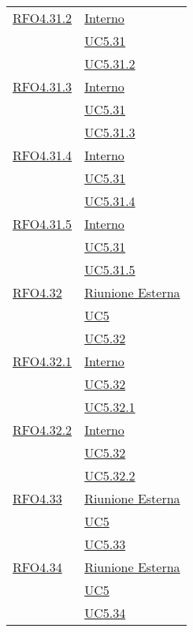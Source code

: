 \begin{longtable}{|>{\centering}m{5cm}|m{5cm}<{\centering}|}
\hyperlink{RFO4.31.2}{RFO4.31.2} &  \hyperlink{Interno}{Interno}\\ &\hyperref[UC5.31]{UC5.31}\\ &\hyperref[UC5.31.2]{UC5.31.2}\\ \hline

\hyperlink{RFO4.31.3}{RFO4.31.3} &  \hyperlink{Interno}{Interno}\\ &\hyperref[UC5.31]{UC5.31}\\ &\hyperref[UC5.31.3]{UC5.31.3}\\ \hline

\hyperlink{RFO4.31.4}{RFO4.31.4} & \hyperlink{Interno}{Interno}\\ &\hyperref[UC5.31]{UC5.31}\\ &\hyperref[UC5.31.4]{UC5.31.4}\\ \hline

\hyperlink{RFO4.31.5}{RFO4.31.5} & \hyperlink{Interno}{Interno}\\ &\hyperref[UC5.31]{UC5.31}\\ &\hyperref[UC5.31.5]{UC5.31.5}\\ \hline

\hyperlink{RFO4.32}{RFO4.32} &  \hyperlink{Riunione Esterna}{Riunione Esterna}\\ &\hyperref[UC5]{UC5}\\ &\hyperref[UC5.32]{UC5.32}\\ \hline

\hyperlink{RFO4.32.1}{RFO4.32.1} & \hyperlink{Interno}{Interno}\\ &\hyperref[UC5.32]{UC5.32}\\ &\hyperref[UC5.32.1]{UC5.32.1}\\ \hline

\hyperlink{RFO4.32.2}{RFO4.32.2} &  \hyperlink{Interno}{Interno}\\ &\hyperref[UC5.32]{UC5.32}\\ &\hyperref[UC5.32.2]{UC5.32.2}\\ \hline

\hyperlink{RFO4.33}{RFO4.33} & \hyperlink{Riunione Esterna}{Riunione Esterna}\\ &\hyperref[UC5]{UC5}\\ &\hyperref[UC5.33]{UC5.33}\\ \hline

\hyperlink{RFO4.34}{RFO4.34} &  \hyperlink{Riunione Esterna}{Riunione Esterna}\\ &\hyperref[UC5]{UC5}\\ &\hyperref[UC5.34]{UC5.34}\\ \hline


\end{longtable}
